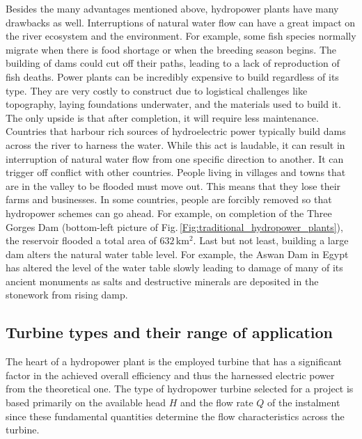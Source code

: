 Besides the many advantages mentioned above, hydropower plants have many drawbacks as well. Interruptions of natural water flow can have a great impact on the river ecosystem and the environment. For example, some fish species normally migrate when there is food shortage or when the breeding season begins. The building of dams could cut off their paths, leading to a lack of reproduction of fish deaths. Power plants can be incredibly expensive to build regardless of its type. They are very costly to construct due to logistical challenges like topography, laying foundations underwater, and the materials used to build it. The only upside is that after completion, it will require less maintenance. Countries that harbour rich sources of hydroelectric power typically build dams across the river to harness the water. While this act is laudable, it can result in interruption of natural water flow from one specific direction to another. It can trigger off conflict with other countries. People living in villages and towns that are in the valley to be flooded must move out. This means that they lose their farms and businesses. In some countries, people are forcibly removed so that hydropower schemes can go ahead. For example, on completion of the Three Gorges Dam (bottom-left picture of Fig.\,\ref{Fig:traditional_hydropower_plants}), the reservoir flooded a total area of $632\,\mathrm{km^2}$. Last but not least, building a large dam alters the natural water table level. For example, the Aswan Dam in Egypt has altered the level of the water table slowly leading to damage of many of its ancient monuments as salts and destructive minerals are deposited in the stonework from rising damp.

\subsection{Turbine types and their range of application}
The heart of a hydropower plant is the employed turbine that has a significant factor in the achieved overall efficiency and thus the harnessed electric power from the theoretical one. The type of hydropower turbine selected for a project is based primarily on the available head $H$ and the flow rate $Q$ of the instalment since these fundamental quantities determine the flow characteristics across the turbine.

